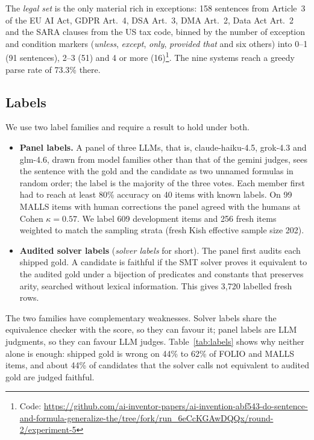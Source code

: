 \documentclass[11pt,letterpaper]{article}
\begin{document}
The \emph{legal set} is the only material rich in exceptions: 158 sentences from Article~3 of the EU AI Act, GDPR Art.~4, DSA Art.~3, DMA Art.~2, Data Act Art.~2 and the SARA clauses from the US tax code, binned by the number of exception and condition markers (\emph{unless}, \emph{except}, \emph{only}, \emph{provided that} and six others) into 0--1 (91 sentences), 2--3 (51) and 4 or more (16)\footnote{Code: \url{https://github.com/ai-inventor-papers/ai-invention-abf543-do-sentence-and-formula-generalize-the/tree/fork/run_6eCcKGAwDQQx/round-2/experiment-5}}. The nine systems reach a greedy parse rate of 73.3\% there.

\subsection{Labels}

We use two label families and require a result to hold under both.
\begin{itemize}
  \item \textbf{Panel labels.} A panel of three LLMs, that is, claude-haiku-4.5, grok-4.3 and glm-4.6, drawn from model families other than that of the gemini judges, sees the sentence with the gold and the candidate as two unnamed formulas in random order; the label is the majority of the three votes. Each member first had to reach at least 80\% accuracy on 40 items with known labels. On 99 MALLS items with human corrections the panel agreed with the humans at Cohen $\kappa = 0.57$. We label 609 development items and 256 fresh items weighted to match the sampling strata (fresh Kish effective sample size 202).
  \item \textbf{Audited solver labels} (\emph{solver labels} for short). The panel first audits each shipped gold. A candidate is faithful if the SMT solver proves it equivalent to the audited gold under a bijection of predicates and constants that preserves arity, searched without lexical information. This gives 3,720 labelled fresh rows.
\end{itemize}

The two families have complementary weaknesses. Solver labels share the equivalence checker with the score, so they can favour it; panel labels are LLM judgments, so they can favour LLM judges. Table~\ref{tab:labels} shows why neither alone is enough: shipped gold is wrong on 44\% to 62\% of FOLIO and MALLS items, and about 44\% of candidates that the solver calls not equivalent to audited gold are judged faithful.
\end{document}
